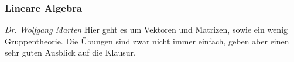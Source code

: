 
\subsubsection{Lineare Algebra}
	\textit{Dr. Wolfgang Marten}
	Hier geht es um Vektoren und Matrizen, sowie ein wenig Gruppentheorie. Die Übungen sind zwar nicht immer einfach, geben aber einen sehr guten Ausblick auf die Klausur.